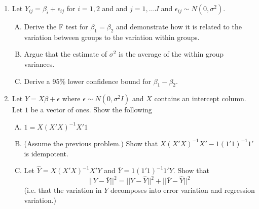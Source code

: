 \documentclass[12pt]{article}
\begin{document}
\begin{enumerate}[1.]
\newpage

\item Let $Y_{ij} = \beta_i + \epsilon_{ij}$ for $i = 1,2$ and and $j = 1,\ldots J$ and $\epsilon_{ij} \sim N(0, \sigma^2)$. 
\begin{enumerate}[A.]
\item Derive the F test for $\beta_1 = \beta_2$ and demonstrate how it is
	 related to the variation between groups to the variation within groups.
\item Argue that the estimate of $\sigma^2$ is the average of the within group variances.
\item Derive a 95\% lower confidence bound for $\beta_1 - \beta_2$.
\end{enumerate}

\newpage

\item Let $Y = X \beta + \epsilon$ where $\epsilon \sim N(0, \sigma^2 I)$ and $X$ contains an intercept column. Let $1$ be a vector of ones. Show the following
\begin{enumerate}[A.]
\item $1 = X(X'X)^{-1}X'1$
\item (Assume the previous problem.) Show that $X(X'X)^{-1}X' - 1(1'1)^{-1}1'$ is idempotent.
\item Let $\hat Y = X (X ' X)^{-1} X' Y$ and $\bar Y = 1 (1'1)^{-1} 1' Y$. Show that 
$$
|| Y - \bar Y ||^2 = ||Y - \hat Y||^2 + ||\bar Y - \hat Y||^2
$$
(i.e. that the variation in $Y$ decomposes into error variation and regression variation.)
\end{enumerate}


\end{enumerate}
\end{document}

